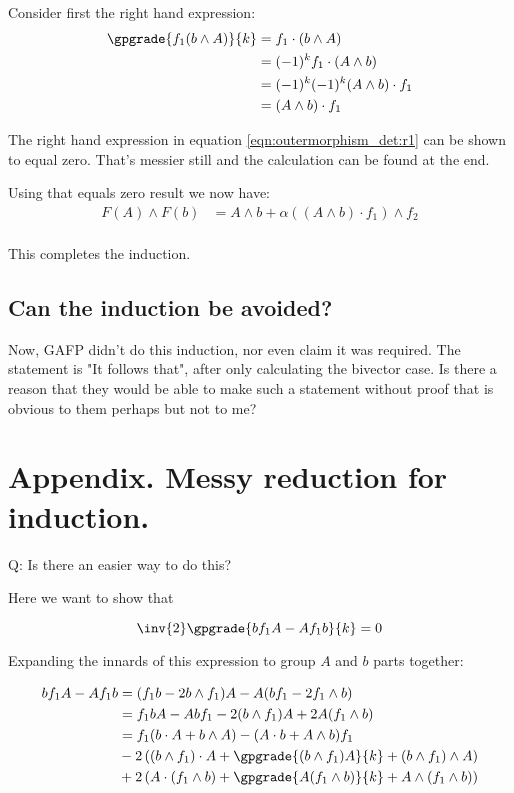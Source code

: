 Consider first the right hand expression:
\begin{align*}
\gpgrade{ f_1 (b \wedge A) }{k} 
&= f_1 \cdot (b \wedge A) \\
&= (-1)^{k} f_1 \cdot (A \wedge b) \\
&= (-1)^{k} (-1)^k (A \wedge b) \cdot f_1 \\
&= (A \wedge b) \cdot f_1 \\
\end{align*}

The right hand expression in equation \ref{eqn:outermorphism_det:r1} can be shown to equal zero.  That's messier still and the calculation can be found 
at the end.

Using that equals zero result we now have:
\begin{align*}
F(A) \wedge F(b)
&= A \wedge b + \alpha ((A \wedge b) \cdot f_1) \wedge f_2 \\
\end{align*}

This completes the induction.

\subsection{Can the induction be avoided? }

Now, GAFP didn't do this induction, nor even claim it was required.  The statement is "It follows that", after only calculating the bivector
case.  Is there a reason that they would be able to make such a statement without proof that is obvious to them perhaps but not to me?


\section{Appendix. Messy reduction for induction. }

Q: Is there an easier way to do this?

Here we want to show that 

\begin{equation*}
\inv{2} \gpgrade{ b f_1 A - A f_1 b}{k} = 0
\end{equation*}

Expanding the innards of this expression to group $A$ and $b$ parts together:

\begin{align*}
b f_1 A - A f_1 b
&= (f_1 b - 2 b \wedge f_1 ) A - A (b f_1 - 2 f_1 \wedge b) \\
&= 
f_1 b A - A b f_1
- 2 (b \wedge f_1) A + 2 A (f_1 \wedge b) \\
&= 
f_1 (b \cdot A + b \wedge A) - (A \cdot b + A \wedge b) f_1 \\
&- 2 \left( (b \wedge f_1) \cdot A + \gpgrade{(b \wedge f_1) A}{k} + (b \wedge f_1) \wedge A \right) \\
&+ 2 \left( A \cdot (f_1 \wedge b) + \gpgrade{A (f_1 \wedge b)}{k} + A \wedge (f_1 \wedge b) \right) 
\end{align*}

